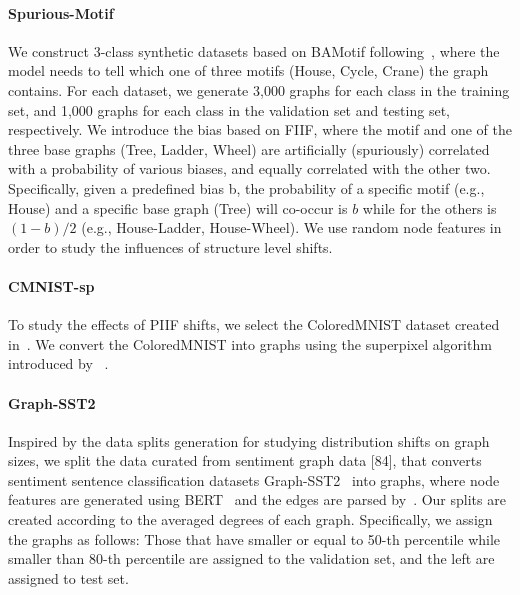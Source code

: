 \paragraph{Spurious-Motif}
We construct 3-class synthetic datasets based on BAMotif following~\cite{dir}, where the model needs to tell which one of three motifs (House, Cycle, Crane) the graph contains. 
For each dataset, we generate 3,000 graphs for each class in the training set, and 1,000 graphs for each class in the validation set and testing set, respectively.
We introduce the bias based on FIIF, where the motif and one of the three base graphs (Tree, Ladder, Wheel) are artificially
(spuriously) correlated with a probability of various biases, and equally correlated with the other two. 
Specifically, given a predefined bias b, the probability of a specific motif (e.g., House) and a
specific base graph (Tree) will co-occur is $b$ while for the others is $(1-b)/2$ (e.g., House-Ladder, House-Wheel). 
We use random node features in order to study the influences of structure level shifts. 

\paragraph{CMNIST-sp} To study the effects of PIIF shifts, we select the ColoredMNIST dataset created
in~\cite{irmv1}. 
We convert the ColoredMNIST into graphs using the superpixel algorithm introduced
by~\cite{understand_att} .

\paragraph{Graph-SST2}
Inspired by the data splits generation for studying distribution shifts on graph sizes, we
split the data curated from sentiment graph data [84], that converts sentiment sentence classification
datasets Graph-SST2~\citep{graph-sst2} into graphs, where node features are generated using BERT~\citep{bert} and the edges are parsed by~\cite{biaffine}. 
Our splits are created according to the averaged degrees of each graph. 
Specifically, we assign the graphs as follows: Those that have smaller or equal to 50-th percentile while smaller than 80-th percentile are assigned to the validation set, and the left are
assigned to test set.

